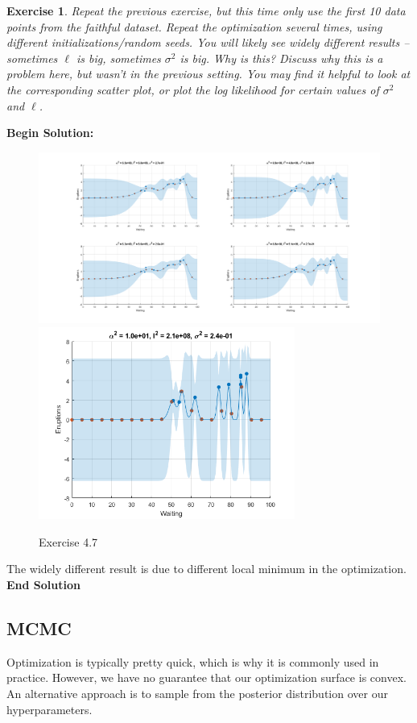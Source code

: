 \documentclass[twoside]{article}
\newcounter{lecnum}
\newtheorem{exercise}{Exercise}[lecnum]
\begin{document}
 \begin{exercise}
   Repeat the previous exercise, but this time only use the first 10 data points from the faithful dataset. Repeat the optimization several times, using different initializations/random seeds. You will likely see widely different results -- sometimes $\ell$ is big, sometimes $\sigma^2$ is big. Why is this? Discuss why this is a problem here, but wasn't in the previous setting. You may find it helpful to look at the corresponding scatter plot, or plot the log likelihood for certain values of $\sigma^2$ and $\ell$.
 \end{exercise}
\textbf{Begin Solution:}
\begin{figure}[H]
\begin{center}
\includegraphics[width=\textwidth]{./Exercise47/exercise471.png}
\includegraphics[width=0.75\textwidth]{./Exercise47/exercise472.png}
\end{center}
\caption{Exercise 4.7}
\end{figure}
The widely different result is due to different local minimum in the optimization.\\  
\textbf{End Solution}
 
 \subsection{MCMC}
 Optimization is typically pretty quick, which is why it is commonly used in practice. However, we have no guarantee that our optimization surface is convex. An alternative approach is to sample from the posterior distribution over our hyperparameters.
\end{document}
